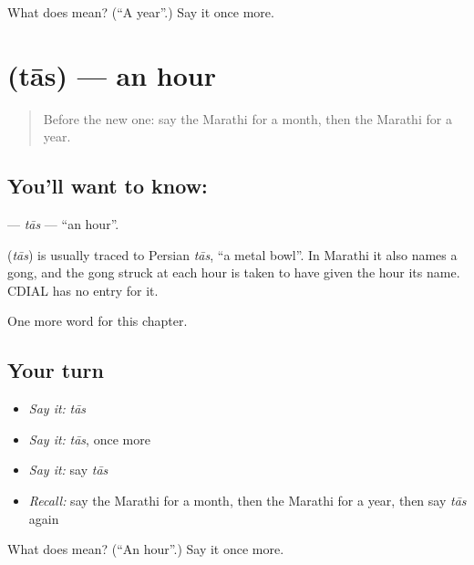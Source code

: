 \begin{tcolorbox}[breakable,colback=teal!4,colframe=teal!35!black,title={Before you move on}]
What does  mean? (\textquotedblleft{}A year\textquotedblright{}.) Say it once more.
\end{tcolorbox}
\section[\texorpdfstring{\mr{तास} (tās)}{तास (tās)}]{ (tās) — an hour}

\label{lesson:MR-C109-tas}



\begin{quote}
Before the new one: say the Marathi for a month, then the Marathi for a year.
\end{quote}

\subsection*{You'll want to know: }
\textbf{} — \emph{tās} — \textquotedblleft{}an hour\textquotedblright{}.

\begin{cousinweb}
\textbf{} (\emph{tās}) is usually traced to Persian \emph{tās}, \textquotedblleft{}a metal bowl\textquotedblright{}. In Marathi it also names a gong, and the gong struck at each hour is taken to have given the hour its name. CDIAL has no entry for it.
\end{cousinweb}

\begin{grammarlens}[title={What you've built}]
One more word for this chapter.
\end{grammarlens}

\subsection*{Your turn}
\begin{itemize}
\raggedright
  \item \emph{Say it:} \emph{tās}
  \item \emph{Say it:} \emph{tās}, once more
  \item \emph{Say it:} say \emph{tās}
  \item \emph{Recall:} say the Marathi for a month, then the Marathi for a year, then say \emph{tās} again
\end{itemize}

\begin{tcolorbox}[breakable,colback=teal!4,colframe=teal!35!black,title={Before you move on}]
What does  mean? (\textquotedblleft{}An hour\textquotedblright{}.) Say it once more.
\end{tcolorbox}
